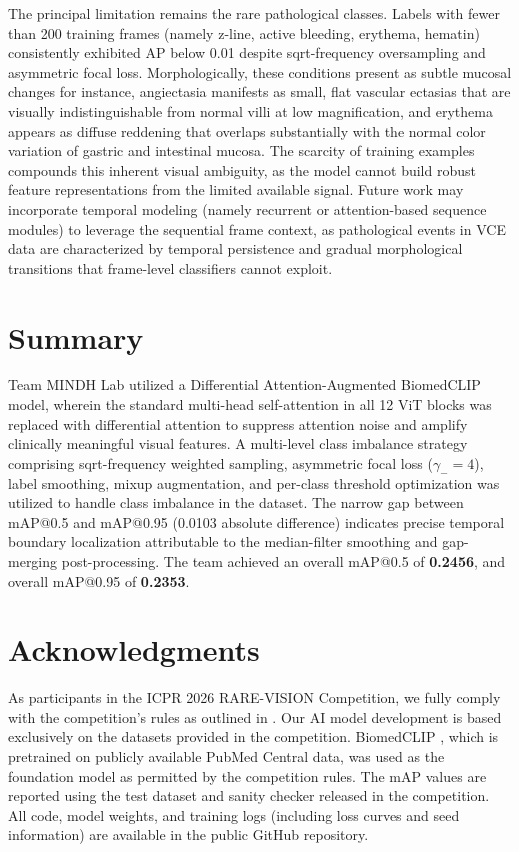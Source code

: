 \documentclass[12pt]{article}
\begin{document}
The principal limitation remains the rare pathological classes. Labels with fewer than 200 training frames (namely z-line, active bleeding, erythema, hematin) consistently exhibited AP below 0.01 despite sqrt-frequency oversampling and asymmetric focal loss. Morphologically, these conditions present as subtle mucosal changes for instance, angiectasia manifests as small, flat vascular ectasias that are visually indistinguishable from normal villi at low magnification, and erythema appears as diffuse reddening that overlaps substantially with the normal color variation of gastric and intestinal mucosa. The scarcity of training examples compounds this inherent visual ambiguity, as the model cannot build robust feature representations from the limited available signal. Future work may incorporate temporal modeling (namely recurrent or attention-based sequence modules) to leverage the sequential frame context, as pathological events in VCE data are characterized by temporal persistence and gradual morphological transitions that frame-level classifiers cannot exploit.


\section{Summary}\label{sec5}

Team MINDH Lab utilized a Differential Attention-Augmented BiomedCLIP model, wherein the standard multi-head self-attention in all 12 ViT blocks was replaced with differential attention to suppress attention noise and amplify clinically meaningful visual features. A multi-level class imbalance strategy comprising sqrt-frequency weighted sampling, asymmetric focal loss ($\gamma_- = 4$), label smoothing, mixup augmentation, and per-class threshold optimization was utilized to handle class imbalance in the dataset. The narrow gap between mAP@0.5 and mAP@0.95 (0.0103 absolute difference) indicates precise temporal boundary localization attributable to the median-filter smoothing and gap-merging post-processing. The team achieved an overall mAP@0.5 of \textbf{0.2456}, and overall mAP@0.95 of \textbf{0.2353}.

\section{Acknowledgments}\label{sec6}

As participants in the ICPR 2026 RARE-VISION Competition, we fully comply with the competition's rules as outlined in \cite{Lawniczak2025}. Our AI model development is based exclusively on the datasets provided in the competition. BiomedCLIP \cite{Zhang2023biomedclip}, which is pretrained on publicly available PubMed Central data, was used as the foundation model as permitted by the competition rules. The mAP values are reported using the test dataset and sanity checker released in the competition. All code, model weights, and training logs (including loss curves and seed information) are available in the public GitHub repository.



\end{document}
